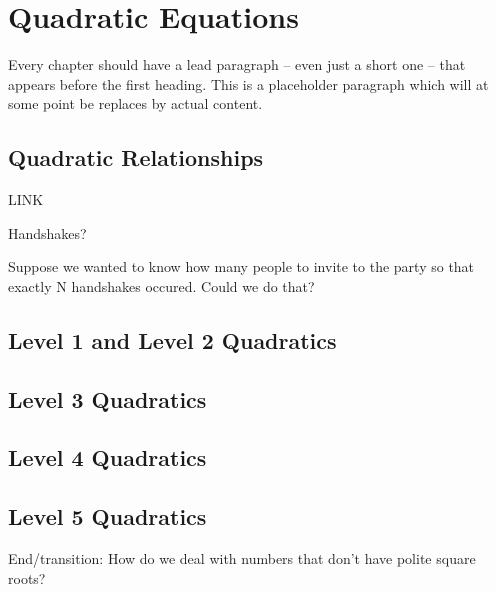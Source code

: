 \chapter{Quadratic Equations}
\label{ch:quadeq}



Every chapter should have a lead paragraph -- even just a short one -- that appears before the first heading. This is a placeholder paragraph which will at some point be replaces by actual content.

\section{Quadratic Relationships}
\label{sec:quadrelationships}

\begin{boxedexplore}
LINK
\end{boxedexplore}

\begin{boxedexplore}
Handshakes?
\end{boxedexplore}

Suppose we wanted to know how many people to invite to the party so that exactly N handshakes occured. Could we do that?

\section{Level 1 and Level 2 Quadratics}

\section{Level 3 Quadratics}

\section{Level 4 Quadratics}

\section{Level 5 Quadratics}



End/transition: How do we deal with numbers that don't have polite square roots?